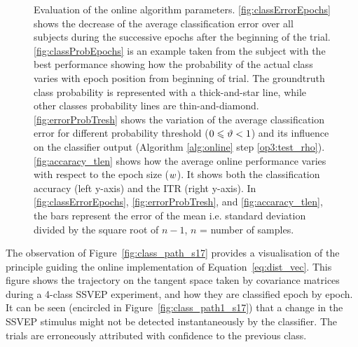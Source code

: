 \begin{figure}[htb!]
\begin{adjustbox}{center}
{{\label{fig:errorProbTresh}
}
}
\end{adjustbox}
\caption{Evaluation of the online algorithm parameters.
        \ref{fig:classErrorEpochs} shows the decrease of the average classification error over all subjects during the successive epochs after the beginning of the trial. 
        \ref{fig:classProbEpochs} is an example taken from the subject with the best performance showing how the probability of the actual class varies with epoch position from beginning of trial.
        The groundtruth class probability is represented with a thick-and-star line, while other classes probability lines are thin-and-diamond.
        \ref{fig:errorProbTresh} shows the variation of the average classification error for different probability threshold ($0 \leqslant \vartheta < 1$) and its influence on the classifier output (Algorithm \ref{alg:online} step \ref{op3:test_rho}).
        \ref{fig:accaracy_tlen} shows how the average online performance varies with respect to the epoch size ($w$).
        It shows both the classification accuracy (left y-axis) and the ITR (right y-axis). In \ref{fig:classErrorEpochs}, \ref{fig:errorProbTresh}, and \ref{fig:accaracy_tlen}, the bars represent the error of the mean i.e. standard deviation divided by the square root of $n-1$, $n$ = number of samples.}
\label{fig:probErrorEpochs}
\end{figure}

The observation of Figure~\ref{fig:class_path_s17} provides a visualisation of the principle guiding the online implementation of Equation~\eqref{eq:dist_vec}.
This figure shows the trajectory on the tangent space taken by covariance matrices during a 4-class SSVEP experiment, and how they are classified epoch by epoch. 
It can be seen (encircled in Figure~\ref{fig:class_path1_s17}) that a change in the SSVEP stimulus might not be detected instantaneously by the classifier. 
The trials are erroneously attributed with confidence to the previous class.

